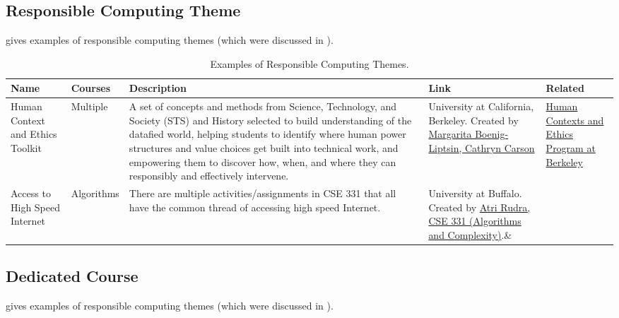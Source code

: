 \subsection{Responsible Computing Theme}

 gives examples of responsible computing themes (which were discussed in ).

\begin{table}[]
    \centering
    {\renewcommand{\arraystretch}{1.2}%
    \begin{tabular}{|P{0.1}|P{0.09}|P{0.47}|P{0.22}|P{0.12}|}
    \hline
    \textbf{Name} & \textbf{Courses} &\textbf{Description}& \textbf{Link} &\textbf{Related}\\
    \hline
Human Context and Ethics Toolkit&
Multiple&
A set of concepts and methods from Science, Technology, and Society (STS) and History selected to build understanding of the datafied world, helping students to identify where human power structures and value choices get built into technical work, and empowering them to discover how, when, and where they can responsibly and effectively intervene.&
University at California, Berkeley. Created by \href{https://data.berkeley.edu/hce-toolkit}{Margarita Boenig-Liptsin, Cathryn Carson} 
&\href{https://data.berkeley.edu/human-contexts-and-ethics}{Human Contexts and Ethics Program at Berkeley}\\ 
\hline
Access to High Speed Internet&
Algorithms&
There are multiple activities/assignments in CSE 331 that all have the common thread of accessing high speed Internet.&
University at Buffalo. Created by \href{https://c4sg.cse.buffalo.edu/projects/Teaching%20Responsible%20Computing.html#algorithms-course-cse-331}{Atri Rudra, CSE 331 (Algorithms and Complexity)}.&
\\
\hline
    \end{tabular}
    }
    \caption{Examples of Responsible Computing Themes.}
    \label{tab:rc-theme-ex}
\end{table}

\subsection{Dedicated Course}

 gives examples of responsible computing themes (which were discussed in ).

